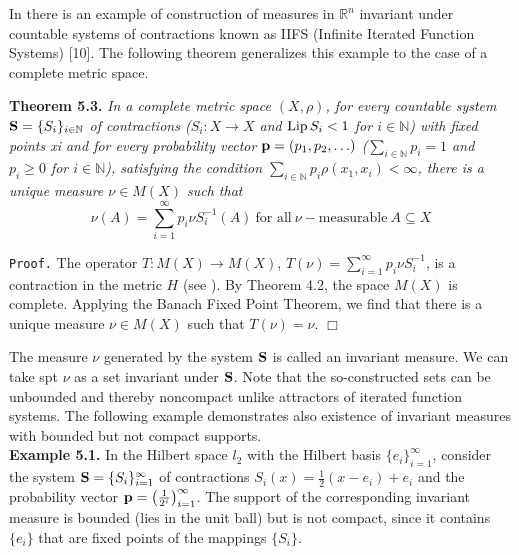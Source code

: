 \documentclass[11pt,a4paper]{article}
\begin{document}
\vspace{1ex}
In \cite{Ak} there is an example of construction of measures in
$\mathbb{R}^n$ invariant under countable systems of
contractions known as IIFS (Infinite Iterated Function Systems) [10]. The following theorem generalizes
this example to the case of a complete metric space.

\filbreak %
\vspace{1em} {\bf Theorem 5.3.} \sl %
In a complete metric space $(X,\rho)$, for every countable system
${\bf S}=\{S_i\}_{i\in \mathbb{N}}$
of contractions
($S_i:X\to X$ and ${{\rm Lip\,} S_i<1}$ for $i\in \mathbb{N}$)
with fixed points xi and for every probability vector
${{\bf p}=(p_1, p_2, \ldots)}$
($\sum_{i\in \mathbb{N}} p_i=1$ and $p_i\ge 0$ for $i\in \mathbb{N}$),
satisfying the condition
$\sum_{i\in \mathbb{N}} p_i \rho(x_1, x_i)<\infty$,
there is a unique measure $\nu\in M(X)$ such that
$$\nu(A)=\sum_{i=1}^{\infty}p_i\nu S_i^{-1}(A)~\mbox{for all}~ \nu-\mbox{measurable}~ A\subseteq X$$
\rm %

{\tt Proof.}
The operator $T:M(X)\to M(X)$, $T(\nu)=\sum_{i=1}^{\infty}p_i\nu S_i^{-1}$,
is a contraction in the metric $H$ (see \cite[3, Theorem 5]{Ak}).
By Theorem 4.2, the space $M(X)$ is complete. Applying the Banach Fixed Point
Theorem, we find that there is a unique measure $\nu\in M(X)$ such that $T(\nu)=\nu$.
\hbox{$\Box$}

\vspace{1em}
The measure $\nu$ generated by the system ${\bf S}$ is called an invariant measure. We can take spt $\nu$ as a set
invariant under ${\bf S}$. Note that the so-constructed sets can be unbounded and thereby noncompact unlike
attractors of iterated function systems. The following example demonstrates also existence of invariant
measures with bounded but not compact supports.
\vspace{1em} \\
{\bf Example 5.1.}
In the Hilbert space $l_2$ with the Hilbert basis $\{e_i\}_{i=1}^{\infty}$,
consider the system ${\bf S}=\{S_i\}_{i=1}^{\infty}$ of contractions
$S_i(x)=\frac{1}{2}(x-e_i)+e_i$
and the probability vector
${\bf p}=\left(\frac{1}{2^i}\right)_{i=1}^{\infty}$.
The support of the corresponding invariant measure is bounded
(lies in the unit ball) but is not compact, since it contains
$\{e_i\}$ that are fixed points of the mappings $\{S_i\}$.
\end{document}
